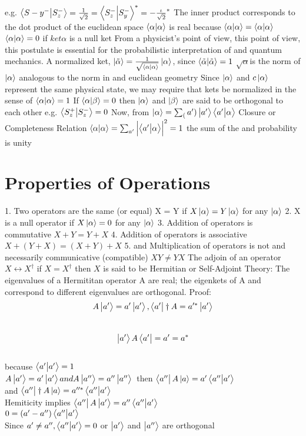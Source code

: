 \documentclass{article}
\begin{document}
e.g. $ \braket{S-y^-}{S_z^-}  = \frac{1}{\sqrt{2}}  = \braket{S_z^-}{S_y^-}^* = - \frac{\iota}{\sqrt{2}}^*$
 The inner product corresponds to the dot product of the euclidean space 
 $ \braket{\alpha}{\alpha}$ is real because $\braket{\alpha}{\alpha} = \braket{\alpha}{\alpha}$
 $\braket{\alpha}{\alpha} = 0$ if $ket{\alpha}$ is a null ket
 From a physicist's point of view, this point of view, this postulate is essential for the probabilistic interpretation of and quantum mechanics. A normalized ket,
 $\ket{\tilde{\alpha}} = \frac{1}{ \sqrt{ \braket{\alpha}{\alpha} }} \ket{ \alpha }$, since $ \braket{ \tilde{\alpha}}{ \tilde{\alpha}} = 1$
 $\sqrt{\alpha	}$is the norm of $\ket{\alpha}$ analogous to the norm in and euclidean geometry
 Since $\ket{\alpha}$ and $c \ket{\alpha}$ represent the same physical state, we may require that kets be normalized in the sense of $\braket{\alpha}{\alpha} = 1$
 If $\braket{\alpha}{\beta} = 0$ then $\ket{\alpha}$ and $\ket{\beta}$ are said to be orthogonal to each other
 e.g. $\braket{S_z^+}{S_z^-} = 0$
 Now, from $\ket{\alpha} = \sum _(a') \ket{a'}\braket{a'}{\alpha}$
 Closure or Completeness Relation
 $ \braket{ \alpha}{ \alpha} = \sum_{a'} \abs{ \braket{a'}{ \alpha}}^2 = 1$
 the sum of the  and probability is unity
\section{Properties of Operations}
1. Two operators are the same (or equal) X = Y if $ X\ket{\alpha} = Y\ket{\alpha}$ for any $\ket{\alpha}$
2. X is a null operator if $X\ket{\alpha} = 0$ for any $\ket{\alpha}$
3. Addition of operators is commutative $ X + Y = Y + X$
4. Addition of operators is associative $ X + ( Y + X) = (X + Y) + X$
5. and Multiplication of operators is not and necessarily communicative (compatible) $XY \neq YX$
The adjoin of an operator
$X \leftrightarrow X^\dagger$ if $X = X^\dagger$ then $X$ is said to be Hermitian or Self-Adjoint
Theory: The eigenvalues of a Hermititan operator A are real; the eigenkets of A and correspond to different eigenvalues are orthogonal.
Proof: 
$$A \ket{a'} = a' \ket{a'}, \bra{a'}\dagger{A} = a'^*\ket{a'}
$$ \\ $$
\ket{a'}A\bra{a'} = a' = a^*
$$\\
because $\braket{a'}{a'} = 1$\\
$A \ket{a'} = a' \ket{a'} and A\ket{a''} = a'' \ket{a''}$\
then $\bra{a''}A\ket{a} = a' \braket{a''}{a'}$\\
and $\bra{a''} \dagger{A} \ket{a} = a''^* \braket{a''}{a'}$\\
Hemiticity implies $\bra{a''} A \ket{a'} = a'' \braket{a''}{a'}$\\
$0 = (a' - a'') \braket{a''}{a'}$ \\
Since $a' \neq a'', \braket{a''}{a'} = 0$ or $\ket{a'}$ and $\ket{a''}$ are orthogonal
\end{document}
